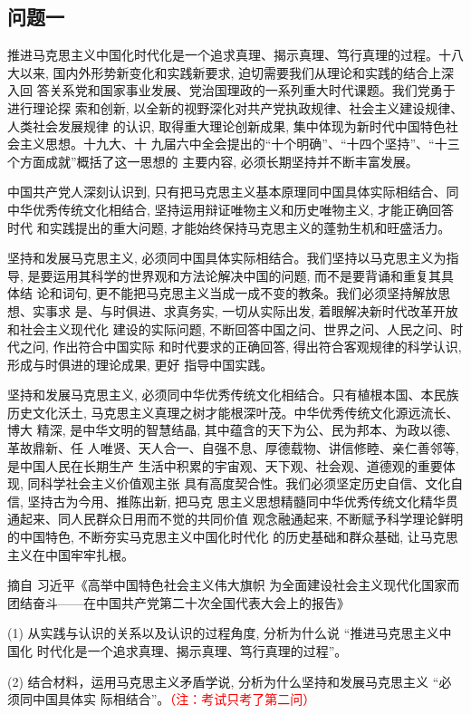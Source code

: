 \documentclass[a4paper,12pt]{article}
\begin{document}
\subsection{问题一}
推进马克思主义中国化时代化是一个追求真理、揭示真理、笃行真理的过程。十八 大以来, 国内外形势新变化和实践新要求, 迫切需要我们从理论和实践的结合上深入回 答关系党和国家事业发展、党治国理政的一系列重大时代课题。我们党勇于进行理论探 索和创新, 以全新的视野深化对共产党执政规律、社会主义建设规律、人类社会发展规律 的认识, 取得重大理论创新成果, 集中体现为新时代中国特色社会主义思想。十九大、十 九届六中全会提出的“十个明确”、“十四个坚持”、“十三个方面成就”概括了这一思想的 主要内容, 必须长期坚持并不断丰富发展。

中国共产党人深刻认识到, 只有把马克思主义基本原理同中国具体实际相结合、同 中华优秀传统文化相结合, 坚持运用辩证唯物主义和历史唯物主义, 才能正确回答时代 和实践提出的重大问题, 才能始终保持马克思主义的蓬勃生机和旺盛活力。

坚持和发展马克思主义, 必须同中国具体实际相结合。我们坚持以马克思主义为指 导, 是要运用其科学的世界观和方法论解决中国的问题, 而不是要背诵和重复其具体结 论和词句, 更不能把马克思主义当成一成不变的教条。我们必须坚持解放思想、实事求 是、与时俱进、求真务实, 一切从实际出发, 着眼解决新时代改革开放和社会主义现代化 建设的实际问题, 不断回答中国之问、世界之问、人民之问、时代之问, 作出符合中国实际 和时代要求的正确回答, 得出符合客观规律的科学认识, 形成与时俱进的理论成果, 更好 指导中国实践。

坚持和发展马克思主义, 必须同中华优秀传统文化相结合。只有植根本国、本民族 历史文化沃土, 马克思主义真理之树才能根深叶茂。中华优秀传统文化源远流长、博大 精深, 是中华文明的智慧结晶, 其中蕴含的天下为公、民为邦本、为政以德、革故鼎新、任 人唯贤、天人合一、自强不息、厚德载物、讲信修睦、亲仁善邻等, 是中国人民在长期生产 生活中积累的宇宙观、天下观、社会观、道德观的重要体现, 同科学社会主义价值观主张 具有高度契合性。我们必须坚定历史自信、文化自信, 坚持古为今用、推陈出新, 把马克 思主义思想精髓同中华优秀传统文化精华贯通起来、同人民群众日用而不觉的共同价值 观念融通起来, 不断赋予科学理论鲜明的中国特色, 不断夯实马克思主义中国化时代化 的历史基础和群众基础, 让马克思主义在中国牢牢扎根。

摘自 习近平《高举中国特色社会主义伟大旗帜 为全面建设社会主义现代化国家而团结奋斗——在中国共产党第二十次全国代表大会上的报告》

(1) 从实践与认识的关系以及认识的过程角度, 分析为什么说 “推进马克思主义中国化 时代化是一个追求真理、揭示真理、笃行真理的过程”。

(2) 结合材料，运用马克思主义矛盾学说, 分析为什么坚持和发展马克思主义 “必须同中国具体实 际相结合”。\textcolor{red}{（注：考试只考了第二问）}
\end{document}
